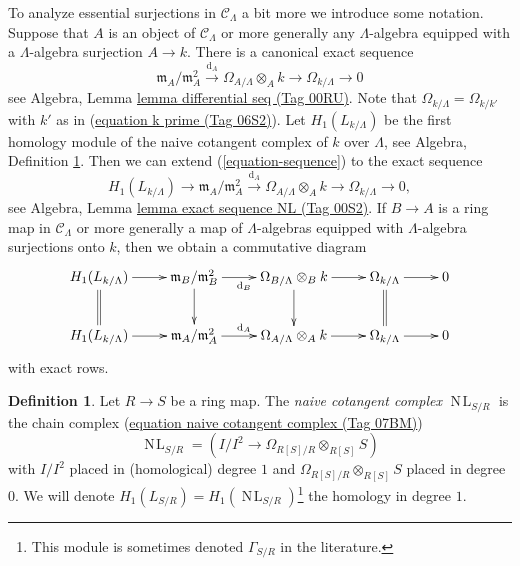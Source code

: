 \documentclass{amsart}
\theoremstyle{plain}
\theoremstyle{definition}
\newtheorem{definition}[subsection]{Definition}
\theoremstyle{remark}
\numberwithin{equation}{subsection}
\def\NL{\mathop{N\!L}\nolimits}
\begin{document}
\noindent
To analyze essential surjections in $\mathcal{C}_\Lambda$ a bit more
we introduce some notation. Suppose that $A$ is an object
of $\mathcal{C}_\Lambda$ or more generally any $\Lambda$-algebra
equipped with a $\Lambda$-algebra surjection $A \to k$.
There is a canonical exact sequence
\begin{equation}
\label{equation-sequence}
\mathfrak m_A/\mathfrak m_A^2 \xrightarrow{\text{d}_A}
\Omega_{A/\Lambda} \otimes_A k \to
\Omega_{k/\Lambda} \to 0
\end{equation}
see
Algebra, Lemma \href{https://stacks.math.columbia.edu/tag/00RU}{lemma differential seq (Tag 00RU)}.
Note that $\Omega_{k/\Lambda} = \Omega_{k/k'}$ with $k'$ as
in (\href{https://stacks.math.columbia.edu/tag/06S2}{equation k prime (Tag 06S2)}). Let $H_1(L_{k/\Lambda})$
be the first homology module of the naive cotangent complex of $k$
over $\Lambda$, see
Algebra, Definition \ref{algebra-definition-naive-cotangent-complex}.
Then we can extend (\ref{equation-sequence})
to the exact sequence
\begin{equation}
\label{equation-sequence-extended}
H_1(L_{k/\Lambda}) \to
\mathfrak m_A/\mathfrak m_A^2 \xrightarrow{\text{d}_A}
\Omega_{A/\Lambda} \otimes_A k \to
\Omega_{k/\Lambda} \to 0,
\end{equation}
see
Algebra, Lemma \href{https://stacks.math.columbia.edu/tag/00S2}{lemma exact sequence NL (Tag 00S2)}.
If $B \to A$ is a ring map in $\mathcal{C}_\Lambda$
or more generally a map of $\Lambda$-algebras equipped
with $\Lambda$-algebra surjections onto $k$, then we obtain a
commutative diagram
\begin{equation}
\label{equation-sequence-functorial}
\vcenter{
\xymatrix{
H_1(L_{k/\Lambda}) \ar[r] \ar@{=}[d] &
\mathfrak m_B/\mathfrak m_B^2 \ar[r]_{\text{d}_B} \ar[d] &
\Omega_{B/\Lambda} \otimes_B k \ar[r] \ar[d] &
\Omega_{k/\Lambda} \ar[r] \ar@{=}[d] & 0 \\
H_1(L_{k/\Lambda}) \ar[r] &
\mathfrak m_A/\mathfrak m_A^2 \ar[r]^{\text{d}_A} &
\Omega_{A/\Lambda} \otimes_A k \ar[r] &
\Omega_{k/\Lambda} \ar[r] & 0
}
}
\end{equation}
with exact rows.

\begin{definition}
\label{algebra-definition-naive-cotangent-complex}
Let $R \to S$ be a ring map. The {\it naive cotangent complex}
$\NL_{S/R}$ is the chain complex (\href{https://stacks.math.columbia.edu/tag/07BM}{equation naive cotangent complex (Tag 07BM)})
$$
\NL_{S/R} = \left(I/I^2 \longrightarrow \Omega_{R[S]/R} \otimes_{R[S]} S\right)
$$
with $I/I^2$ placed in (homological) degree $1$ and
$\Omega_{R[S]/R} \otimes_{R[S]} S$ placed in degree $0$. We will denote
$H_1(L_{S/R}) = H_1(\NL_{S/R})$\footnote{This module is sometimes
denoted $\Gamma_{S/R}$ in the literature.} the homology in degree $1$.
\end{definition}
\end{document}
